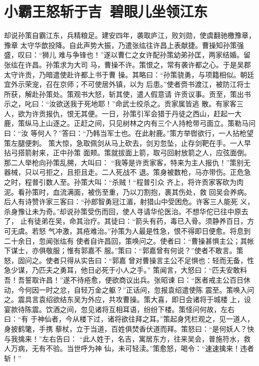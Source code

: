 \chapter{小霸王怒斩于吉~碧眼儿坐领江东}

却说孙策自霸江东，兵精粮足。建安四年，袭取庐江，败刘勋，使虞翻驰檄豫章，豫章
太守华歆投降。自此声势大振，乃遣张纮往许昌上表献捷。曹操知孙策强盛，叹曰：“狮儿
难与争锋也！”遂以曹仁之女许配孙策幼弟孙匡，两家结婚。留张纮在许昌。孙策求为大司
马，曹操不许。策恨之，常有袭许都之心。于是吴郡太守许贡，乃暗遣使赴许都上书于曹
操。其略曰：“孙策骁勇，与项籍相似。朝廷宜外示荣宠，召在京师；不可使居外镇，以为
后患。”使者赍书渡江，被防江将士所获，解赴孙策处。策观书大怒，斩其使，遣人假意请
许贡议事。贡至，策出书示之，叱曰：“汝欲送我于死地耶！”命武士绞杀之。贡家属皆逃
散。有家客三人，欲为许贡报仇，恨无其便。一日，孙策引军会猎于丹徒之西山，赶起一大
鹿，策纵马上山逐之。正赶之间，只见树林之内有三个人持枪带弓面立。策勒马问曰：“汝
等何人？”答曰：“乃韩当军士也。在此射鹿。”策方举辔欲行，一人拈枪望策左腿便刺。
策大惊，急取佩剑从马上砍去，剑刃忽坠，止存剑靶在手。一人早拈弓搭箭射来，正中孙策
面颊。策就拔面上箭，取弓回射放箭之人，应弦面倒。那二人举枪向孙策乱搠，大叫曰：
“我等是许贡家客，特来为主人报仇！”策别无器械，只以弓拒之，且拒且走。二人死战不
退。策身被数枪，马亦带伤。正危急之时，程普引数人至。孙策大叫：“杀贼！“程普引众
齐上，将许贡家客砍为肉泥。看孙策时，血流满面，被伤至重，乃以刀割抱，裹其伤处，救
回吴会养病。后人有诗赞许家三客曰：“孙郎智勇冠江湄，射猎山中受困危。许客三人能死
义，杀身豫让未为奇。”却说孙策受伤而回，使人寻请华伦医治。不想华佗已往中原去了，
止有徒弟在吴，命其治疗。其徒曰：“箭头有药，毒已入骨。须静养百日，方可无虞。若怒
气冲激，其疮难治。”孙策为人最是性急，恨不得即日便愈。将息到二十余日，忽闻张纮有
使者自许昌回，策唤问之。使者曰：“曹操甚惧主公；其帐下谋士，亦俱敬服；惟有郭嘉不
服。”策曰：“郭嘉曾有何说？”使者不敢言。策怒，固问之。使者只得从实告曰：“郭嘉
曾对曹操言主公不足惧也：轻而无备，性急少谋，乃匹夫之勇耳，他日必死于小人之手。”
策闻言，大怒曰：“匹夫安敢料吾！吾誓取许昌！”遂不待疮愈，便欲商议出兵。张昭谏
曰：“医者戒主公百日休动，今何因一时之忿，自轻万金之躯？”正话间，忽报袁绍遣使陈
震至。策唤入问之。震具言袁绍欲结东吴为外应，共攻曹操。策大喜，即日会诸将于城楼
上，设宴款待陈震。饮酒之间，忽见诸将互相耳语，纷纷下楼。策怪问何故，左右曰：“有
于神仙者，今从楼下过，诸将欲往拜之耳。”策起身凭栏观之，见一道人，身披鹤氅，手携
藜杖，立于当道，百姓俱焚香伏道而拜。策怒曰：“是何妖人？快与我擒来！”左右告曰：
“此人姓于，名吉，寓居东方，往来吴会，普施符水，救人万病，无有不验。当世呼为神
仙，未可轻渎。”策愈怒，喝令：“速速擒来！违者斩！”

